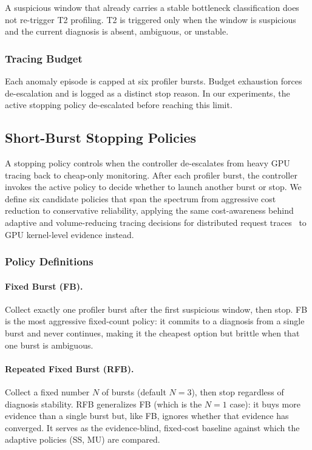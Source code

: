 A suspicious window that already carries a stable bottleneck classification does not re-trigger T2 profiling. T2 is triggered only when the window is suspicious and the current diagnosis is absent, ambiguous, or unstable.

\subsubsection{Tracing Budget}

Each anomaly episode is capped at six profiler bursts. Budget exhaustion forces de-escalation and is logged as a distinct stop reason. In our experiments, the active stopping policy de-escalated before reaching this limit.


\subsection{Short-Burst Stopping Policies}
\label{sec:stopping-policies}
A stopping policy controls when the controller de-escalates from heavy GPU tracing back to cheap-only monitoring. After each profiler burst, the controller invokes the active policy to decide whether to launch another burst or stop. We define six candidate policies that span the spectrum from aggressive cost reduction to conservative reliability, applying the same cost-awareness behind adaptive and volume-reducing tracing decisions for distributed request traces~\cite{lascasas2019sifter,chen2024tracemesh,huang2024mint,chen2025tracezip,zhang2021threemilebeach} to GPU kernel-level evidence instead.


\subsubsection{Policy Definitions}

\paragraph{Fixed Burst (\textsc{FB}).}
Collect exactly one profiler burst after the first suspicious window, then stop. \textsc{FB} is the most aggressive fixed-count policy: it commits to a diagnosis from a single burst and never continues, making it the cheapest option but brittle when that one burst is ambiguous.

\paragraph{Repeated Fixed Burst (\textsc{RFB}).}
Collect a fixed number $N$ of bursts (default $N=3$), then stop regardless of diagnosis stability. \textsc{RFB} generalizes \textsc{FB} (which is the $N=1$ case): it buys more evidence than a single burst but, like \textsc{FB}, ignores whether that evidence has converged. It serves as the evidence-blind, fixed-cost baseline against which the adaptive policies (\textsc{SS}, \textsc{MU}) are compared.

